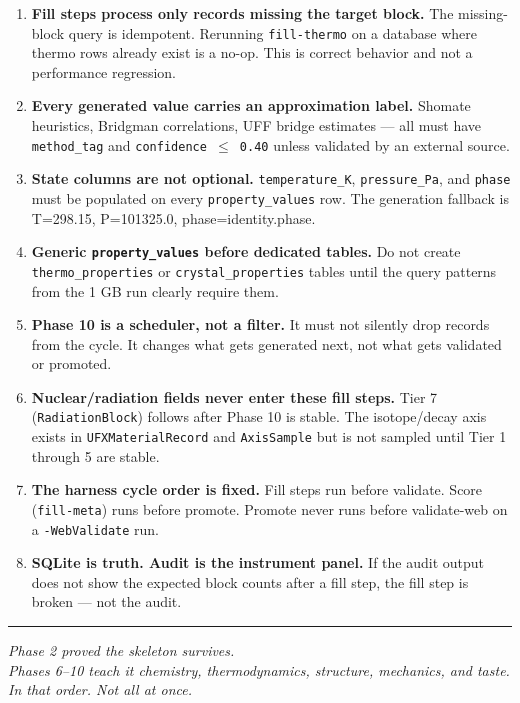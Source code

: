 \documentclass[11pt, a4paper]{article}
\begin{document}
\begin{rulebox}
\begin{enumerate}[leftmargin=*, itemsep=6pt]

  \item \textbf{Fill steps process only records missing the target block.}
		The missing-block query is idempotent.  Rerunning \texttt{fill-thermo}
		on a database where thermo rows already exist is a no-op.  This is
		correct behavior and not a performance regression.

  \item \textbf{Every generated value carries an approximation label.}
		Shomate heuristics, Bridgman correlations, UFF bridge estimates ---
		all must have \texttt{method\_tag} and \texttt{confidence $\leq$ 0.40}
		unless validated by an external source.

  \item \textbf{State columns are not optional.}  \texttt{temperature\_K},
		\texttt{pressure\_Pa}, and \texttt{phase} must be populated on every
		\texttt{property\_values} row.  The generation fallback is T=298.15,
		P=101325.0, phase=identity.phase.

  \item \textbf{Generic \texttt{property\_values} before dedicated tables.}
		Do not create \texttt{thermo\_properties} or \texttt{crystal\_properties}
		tables until the query patterns from the 1 GB run clearly require them.

  \item \textbf{Phase 10 is a scheduler, not a filter.}  It must not silently
		drop records from the cycle.  It changes what gets generated next,
		not what gets validated or promoted.

  \item \textbf{Nuclear/radiation fields never enter these fill steps.}
		Tier 7 (\texttt{RadiationBlock}) follows after Phase 10 is stable.
		The isotope/decay axis exists in \texttt{UFXMaterialRecord} and
		\texttt{AxisSample} but is not sampled until Tier 1 through 5 are stable.

  \item \textbf{The harness cycle order is fixed.}  Fill steps run before
		validate.  Score (\texttt{fill-meta}) runs before promote.
		Promote never runs before validate-web on a \texttt{-WebValidate} run.

  \item \textbf{SQLite is truth.  Audit is the instrument panel.}  If the
		audit output does not show the expected block counts after a fill step,
		the fill step is broken --- not the audit.

\end{enumerate}
\end{rulebox}

\vspace{10pt}
\hrule
\vspace{8pt}

\begin{center}
\textit{Phase 2 proved the skeleton survives.\\
Phases 6--10 teach it chemistry, thermodynamics, structure, mechanics, and taste.\\
In that order.  Not all at once.}
\end{center}
\end{document}
